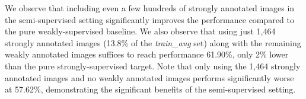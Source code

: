 We observe that including even a few hundreds of strongly annotated
images in the semi-supervised setting significantly improves the 
performance compared to the pure weakly-supervised baseline. We also
observe that using just 1,464 strongly annotated images (13.8\% of the
\textsl{train\_aug} set) along with the remaining weakly annotated
images suffices to reach performance 61.90\%, only 2\% lower than the
pure strongly-supervised target. Note that only using the 1,464
strongly annotated images and no weakly annotated images performs
significantly worse at 57.62\%, demonstrating the significant benefits
of the semi-supervised setting.

\begin{table}[t]
  \centering
  \caption{DeepLab-CRF VOC 2012 \textsl{val} performance using
    both strong pixel-level and weak image-level annotations.}
  \label{tab:strong_weak_annot}
\end{table}


